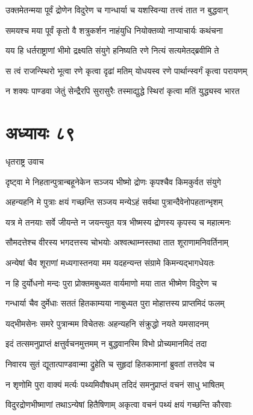 \twolineshloka
{उक्तमेतन्मया पूर्वं द्रोणेन विदुरेण च}
{गान्धार्या च यशस्विन्या तत्त्वं तात न बुद्धवान्}


\twolineshloka
{समयश्च मया पूर्वं कृतो वै शत्रुकर्शन}
{नाहंयुधि नियोक्तव्यो नाप्याचार्यः कथंचना}


\twolineshloka
{यय हि धर्तराष्ट्राणां भीमो द्रक्ष्यति संयुगे}
{हनिष्यति रणे नित्यं सत्यमेतद्ब्रवीमि ते}


\twolineshloka
{स त्वं राजन्स्थिरो भूत्वा रणे कृत्वा दृढां मतिम्}
{योधयस्व रणे पार्थान्स्वर्गं कृत्वा परायणम्}


\twolineshloka
{न शक्यः पाण्डवा जेतुं सेन्द्रैरपि सुरासुरैः}
{तस्माद्युद्धे स्थिरां कृत्वा मतिं युद्ध्यस्व भारत}


\chapter{अध्यायः ८९}
\twolineshloka
{धृतराष्ट्र उवाच}
{}


\twolineshloka
{दृष्ट्वा मे निहतान्पुत्रान्बहूनेकेन सञ्जय}
{भीष्मो द्रोणः कृपश्चैव किमकुर्वत संयुगे}


\twolineshloka
{अहन्यहनि मे पुत्राः क्षयं गच्छन्ति सञ्जय}
{मन्येऽहं सर्वथा पुत्रान्दैवेनोपहतान्भृशम्}


\twolineshloka
{यत्र मे तनयाः सर्वे जीयन्ते न जयन्त्युत}
{यत्र भीष्मस्य द्रोणस्य कृपस्य च महात्मनः}


\twolineshloka
{सौमदत्तेश्च वीरस्य भगदत्तस्य चोभयोः}
{अश्वत्थाम्नस्तथा तात शूराणामनिवर्तिनाम्}


\twolineshloka
{अन्येषां चैव शूराणां मध्यगास्तनया मम}
{यदहन्यन्त संग्रामे किमन्यद्भागधेयतः}


\twolineshloka
{न हि दुर्योधनो मन्दः पुरा प्रोक्तमबुध्यत}
{वार्यमाणो मया तात भीष्मेण विदुरेण च}


\twolineshloka
{गन्धार्या चैव दुर्मेधाः सततं हितकाम्यया}
{नाबुध्यत पुरा मोहात्तस्य प्राप्तमिदं फलम्}


\twolineshloka
{यद्भीमसेनः समरे पुत्रान्मम विचेतसः}
{अहन्यहनि संक्रुद्धो नयते यमसादनम्}


\twolineshloka
{इदं तत्समनुप्राप्तं क्षत्तुर्वचनमुत्तमम्}
{न बुद्धवानस्मि विभो प्रोच्यमानमिदं तदा}


\twolineshloka
{निवारय सुतं द्यूतात्पाण्डवान्मा द्रुहेति च}
{सुहृदां हितकामानां ब्रुवतां तत्तदेव च}


\twolineshloka
{न शृणोमि पुरा वाक्यं मर्त्यः पथ्यमिवौषधम्}
{तदिदं समनुप्राप्तं वचनं साधु भाषितम्}


\twolineshloka
{विदुरद्रोणभीष्माणां तथाऽन्येषां हितैषिणाम्}
{अकृत्वा वचनं पथ्यं क्षयं गच्छन्ति कौरवाः}


